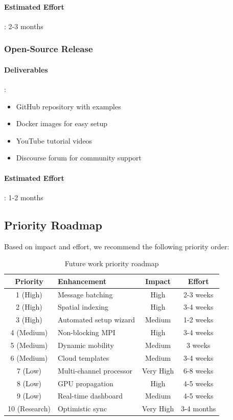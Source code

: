 \paragraph{Estimated Effort}: 2-3 months

\subsubsection{Open-Source Release}

\paragraph{Deliverables}:
\begin{itemize}
    \item GitHub repository with examples
    \item Docker images for easy setup
    \item YouTube tutorial videos
    \item Discourse forum for community support
\end{itemize}

\paragraph{Estimated Effort}: 1-2 months

\subsection{Priority Roadmap}

Based on impact and effort, we recommend the following priority order:

\begin{table}[htbp]
\centering
\caption{Future work priority roadmap}
\label{tab:future-work-roadmap}
\small
\begin{tabular}{@{}clcc@{}}
\toprule
\textbf{Priority} & \textbf{Enhancement} & \textbf{Impact} & \textbf{Effort} \\
\midrule
1 (High) & Message batching & High & 2-3 weeks \\
2 (High) & Spatial indexing & High & 3-4 weeks \\
3 (High) & Automated setup wizard & Medium & 1-2 weeks \\
4 (Medium) & Non-blocking MPI & High & 3-4 weeks \\
5 (Medium) & Dynamic mobility & Medium & 3 weeks \\
6 (Medium) & Cloud templates & Medium & 3-4 weeks \\
7 (Low) & Multi-channel processor & Very High & 6-8 weeks \\
8 (Low) & GPU propagation & High & 4-5 weeks \\
9 (Low) & Real-time dashboard & Medium & 4-5 weeks \\
10 (Research) & Optimistic sync & Very High & 3-4 months \\
\bottomrule
\end{tabular}
\end{table}

